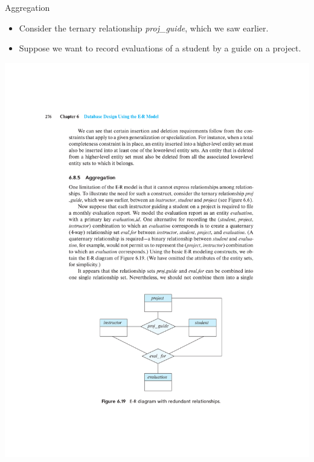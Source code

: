 \documentclass{beamer}
\begin{document}
\begin{frame}{Aggregation}
    \begin{itemize}
        \item Consider the ternary relationship \textit{proj\_guide}, which we saw earlier.
        \item Suppose we want to record evaluations of a student by a guide on a project.
    \end{itemize}
    \centering
    \includegraphics[trim={4cm 4.25cm 4cm 16cm}, clip, width=\textwidth]{figures/redundat_relationships}
\end{frame}
\end{document}
